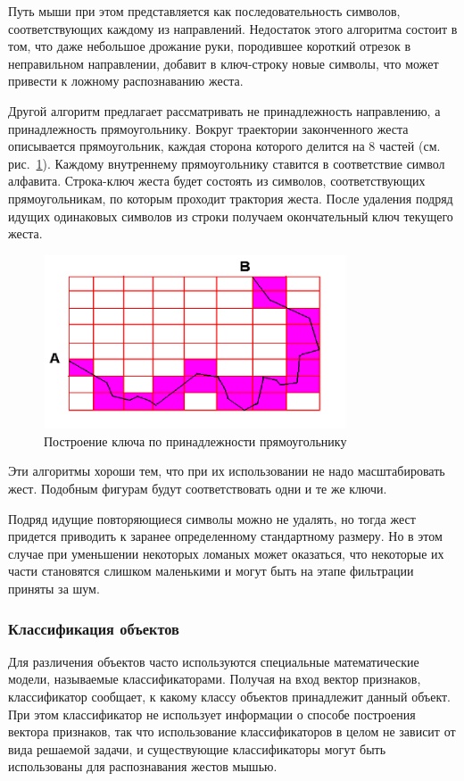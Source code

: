 \documentclass[a5paper]{article}
\begin{document}
Путь мыши при этом представляется как последовательность символов, соответствующих каждому из направлений. Недостаток этого алгоритма состоит в том, что даже небольшое дрожание руки, породившее короткий отрезок в неправильном направлении, добавит в ключ-строку новые символы, что может привести к ложному распознаванию жеста.

Другой алгоритм предлагает рассматривать не принадлежность направлению, а принадлежность прямоугольнику. Вокруг траектории законченного жеста описывается прямоугольник, каждая сторона которого делится на 8 частей (см. рис.~\ref{squares}). Каждому внутреннему прямоугольнику ставится в соответствие символ алфавита. Строка-ключ жеста будет состоять из символов, соответствующих прямоугольникам, по которым проходит трактория жеста. После удаления подряд идущих одинаковых символов из строки получаем окончательный ключ текущего жеста. 

\begin{figure} [ht]
  \begin{center}
    \includegraphics[width=0.8\textwidth, bb=0 0 544 390]{03-squares.png}
    \caption{Построение ключа по принадлежности прямоугольнику}
    \label{squares}
  \end{center}
\end{figure}

Эти алгоритмы хороши тем, что при их использовании не надо масштабировать жест. Подобным фигурам будут соответствовать одни и те же ключи.

Подряд идущие повторяющиеся символы можно не удалять, но тогда жест придется приводить к заранее определенному стандартному размеру. Но в этом случае при уменьшении некоторых ломаных может оказаться, что некоторые их части становятся слишком маленькими и могут быть на этапе фильтрации приняты за шум.

\subsubsection{Классификация объектов}
Для различения объектов часто используются специальные математические модели, называемые классификаторами. Получая на вход вектор признаков, классификатор сообщает, к какому классу объектов принадлежит данный объект. При этом классификатор не использует информации о способе построения вектора признаков, так что использование классификаторов в целом не зависит от вида решаемой задачи, и существующие классификаторы могут быть использованы для распознавания жестов мышью. 
\end{document}
